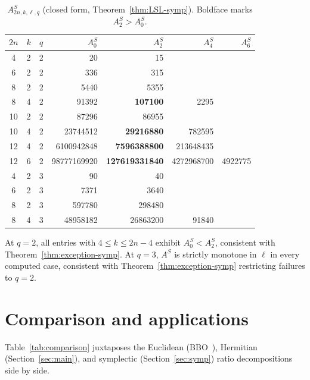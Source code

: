 \documentclass[10pt,a4paper]{amsart}
\begin{document}
\begin{table}[h]
\centering
\caption{$A^S_{2n,k,\ell,q}$ (closed form, Theorem~\ref{thm:LSL-symp}).
Boldface marks $A^S_2 > A^S_0$.}
\label{tab:symplectic-A}
\begin{tabular}{ccc|rrrr}
\toprule
$2n$ & $k$ & $q$ & $A^S_0$ & $A^S_2$ & $A^S_4$ & $A^S_6$ \\
\midrule
4 & 2 & 2 & 20 & 15 & & \\
6 & 2 & 2 & 336 & 315 & & \\
8 & 2 & 2 & 5440 & 5355 & & \\
8 & 4 & 2 & 91392 & \textbf{107100} & 2295 & \\
10 & 2 & 2 & 87296 & 86955 & & \\
10 & 4 & 2 & 23744512 & \textbf{29216880} & 782595 & \\
12 & 4 & 2 & 6100942848 & \textbf{7596388800} & 213648435 & \\
12 & 6 & 2 & 98777169920 & \textbf{127619331840} & 4272968700 & 4922775 \\
\midrule
4 & 2 & 3 & 90 & 40 & & \\
6 & 2 & 3 & 7371 & 3640 & & \\
8 & 2 & 3 & 597780 & 298480 & & \\
8 & 4 & 3 & 48958182 & 26863200 & 91840 & \\
\bottomrule
\end{tabular}
\end{table}

At $q = 2$, all entries with $4 \leq k \leq 2n - 4$ exhibit
$A^S_0 < A^S_2$, consistent with Theorem~\ref{thm:exception-symp}.
At $q = 3$, $A^S$ is strictly monotone in $\ell$ in every computed case,
consistent with Theorem~\ref{thm:exception-symp} restricting failures to $q = 2$.

\section{Comparison and applications}\label{sec:comp-app}

Table~\ref{tab:comparison} juxtaposes the Euclidean (BBO~\cite{BBOz2026}),
Hermitian (Section~\ref{sec:main}), and symplectic (Section~\ref{sec:symp}) ratio
decompositions side by side.
\end{document}
